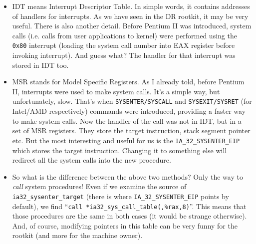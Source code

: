 \documentclass[12pt]{article}
\begin{document}
  \begin{itemize}
    \item IDT means Interrupt Descriptor Table. In simple words, it contains
      addresses of handlers for interrupts. As we have seen in the DR rootkit,
      it may be very useful. There is also another detail.  Before Pentium II
      was introduced, system calls (i.e. calls from user applications to
      kernel) were performed using the \verb!0x80!  interrupt (loading the
      system call number into EAX register before invoking interrupt). And
      guess what? The handler for that interrupt was stored in IDT too.

    \item MSR stands for Model Specific Registers. As I already told, before
      Pentium II, interrupts were used to make system calls. It's a simple
      way, but unfortunately, slow. That's when \verb!SYSENTER/SYSCALL! and
      \verb!SYSEXIT/SYSRET! (for Intel/AMD respectively) commands were
      introduced, providing a faster way to make system calls. Now the handler
      of the call was not in IDT, but in a set of MSR registers. They store
      the target instruction, stack segment pointer etc. But the most
      interesting and useful for us is the \verb!IA_32_SYSENTER_EIP! which
      stores the target instruction. Changing it to something else will
      redirect all the system calls into the new procedure.

    \item So what is the difference between the above two methods? Only the
      way to \emph{call} system procedures! Even if we examine the source of
      \verb!ia32_sysenter_target! (there is where \verb!IA_32_SYSENTER_EIP!
  points by default), we find
  ``\verb!call *ia32_sys_call_table(,%rax,8)!''. This means that those
  procedures are the same in both cases (it would be strange otherwise). And,
  of course, modifying pointers in this table can be very funny for the
  rootkit (and more for the machine owner).
  \end{itemize}
\end{document}
